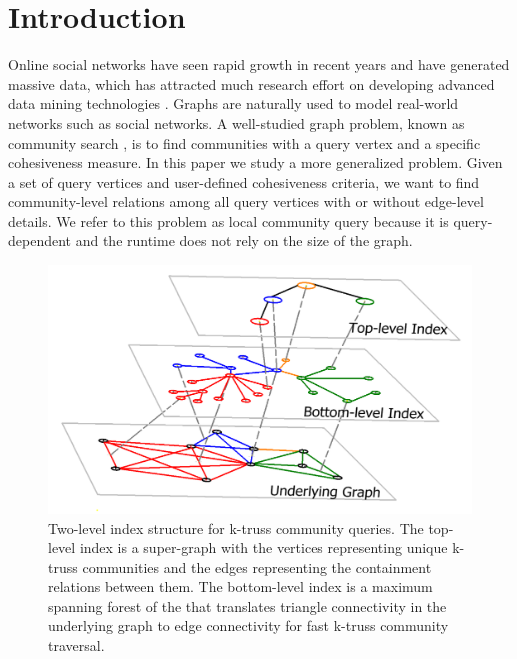 \section{Introduction}
\label{introduction}

Online social networks have seen rapid growth in recent years and have generated massive data, which has attracted much research effort on developing advanced data mining technologies \cite{cohen2008trusses, liu2018connect, wang2017big, wu2018social}. Graphs are naturally used to model real-world networks such as social networks. A well-studied graph problem, known as community search \cite{huang2014querying, akbas2017truss, sozio2010community, cui2014local}, is to find communities with a query vertex and a specific cohesiveness measure. 
In this paper we study a more generalized problem. Given a set of query vertices and user-defined cohesiveness criteria, we want to find community-level relations among all query vertices with or without edge-level details. 
We refer to this problem as local community query because it is query-dependent and the runtime does not rely on the size of the graph. 

\begin{figure}[ht]
    \centering
    \includegraphics[width=0.9\linewidth]{./figures/illustration_main.png}
		\vspace{-0.2cm}
    \caption{Two-level index structure for k-truss community queries. The top-level index is a super-graph with the vertices representing unique k-truss communities and the edges representing the containment relations between them. The bottom-level index is a maximum spanning forest of the\inducedgraph{} that translates triangle connectivity in the underlying graph to edge connectivity for fast k-truss community traversal.}
    \label{fig:illustration_main}
		\vspace{-0.5cm}
\end{figure}


